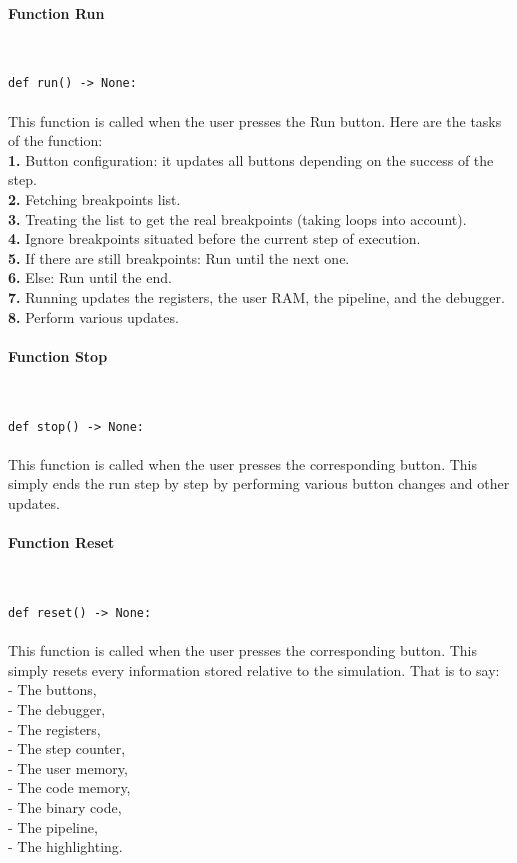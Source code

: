 \documentclass{article}
\newcommand{\subsubsubsection}[1]{\paragraph{#1}\mbox{}\\}
\begin{document}
\subsubsubsection{Function Run}
\begin{lstlisting}[language=MyPython]
def run() -> None:
\end{lstlisting}
\paragraph{}

This function is called when the user presses the Run button. Here are the tasks of the function: \\
\textbf{1.} Button configuration: it updates all buttons depending on the success of the step. \\
\textbf{2.} Fetching breakpoints list. \\
\textbf{3.} Treating the list to get the real breakpoints (taking loops into account). \\
\textbf{4.} Ignore breakpoints situated before the current step of execution. \\
\textbf{5.} If there are still breakpoints: Run until the next one. \\
\textbf{6.} Else: Run until the end. \\
\textbf{7.} Running updates the registers, the user RAM, the pipeline, and the debugger. \\
\textbf{8.} Perform various updates. \\

\subsubsubsection{Function Stop}
\begin{lstlisting}[language=MyPython]
def stop() -> None:
\end{lstlisting}
\paragraph{}

This function is called when the user presses the corresponding button. This simply ends the run step by step by performing various button changes and other updates.


\newpage
\subsubsubsection{Function Reset}
\begin{lstlisting}[language=MyPython]
def reset() -> None:
\end{lstlisting}
\paragraph{}

This function is called when the user presses the corresponding button. This simply resets every information stored relative to the simulation. That is to say: \\
 - The buttons, \\
 - The debugger, \\
 - The registers, \\
 - The step counter, \\
 - The user memory, \\
 - The code memory, \\
 - The binary code, \\
 - The pipeline, \\
 - The highlighting. \\
\end{document}
